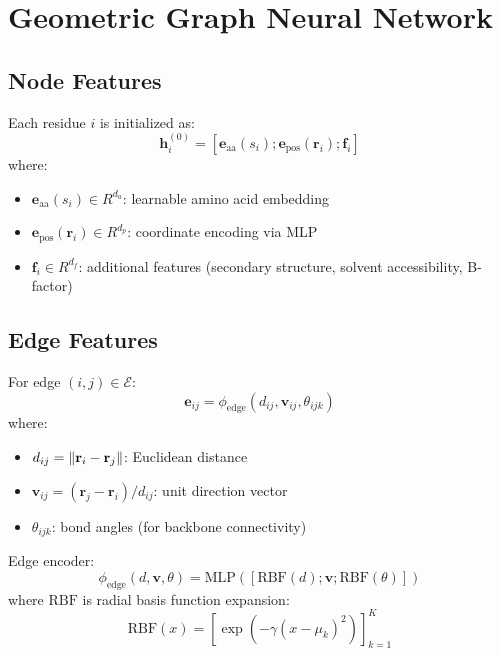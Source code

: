 \documentclass[11pt]{article}
\DeclarePairedDelimiter{\norm}{\lVert}{\rVert}
\begin{document}
\section{Geometric Graph Neural Network}

\subsection{Node Features}

Each residue $i$ is initialized as:
\begin{equation}
    \mathbf{h}_i^{(0)} = [\mathbf{e}_{\text{aa}}(s_i); \mathbf{e}_{\text{pos}}(\mathbf{r}_i); \mathbf{f}_i]
\end{equation}
where:
\begin{itemize}
    \item $\mathbf{e}_{\text{aa}}(s_i) \in R^{d_a}$: learnable amino acid embedding
    \item $\mathbf{e}_{\text{pos}}(\mathbf{r}_i) \in R^{d_p}$: coordinate encoding via MLP
    \item $\mathbf{f}_i \in R^{d_f}$: additional features (secondary structure, solvent accessibility, B-factor)
\end{itemize}

\subsection{Edge Features}

For edge $(i,j) \in \mathcal{E}$:
\begin{equation}
    \mathbf{e}_{ij} = \phi_{\text{edge}}(d_{ij}, \mathbf{v}_{ij}, \theta_{ijk})
\end{equation}
where:
\begin{itemize}
    \item $d_{ij} = \norm{\mathbf{r}_i - \mathbf{r}_j}$: Euclidean distance
    \item $\mathbf{v}_{ij} = (\mathbf{r}_j - \mathbf{r}_i)/d_{ij}$: unit direction vector
    \item $\theta_{ijk}$: bond angles (for backbone connectivity)
\end{itemize}

Edge encoder:
\begin{equation}
    \phi_{\text{edge}}(d, \mathbf{v}, \theta) = \text{MLP}([\text{RBF}(d); \mathbf{v}; \text{RBF}(\theta)])
\end{equation}
where $\text{RBF}$ is radial basis function expansion:
\begin{equation}
    \text{RBF}(x) = [\exp(-\gamma (x - \mu_k)^2)]_{k=1}^K
\end{equation}
\end{document}
